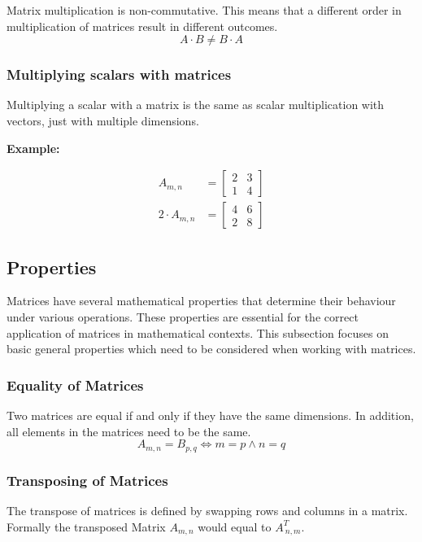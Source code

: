 Matrix multiplication is non-commutative. This means that a different order in multiplication of matrices result in different outcomes.\ \cite{Web:23}
\[
A \cdot B \neq B \cdot A
\]

\subsubsection{Multiplying scalars with matrices}

Multiplying a scalar with a matrix is the same as scalar multiplication with vectors, just with multiple dimensions.

\textbf{Example:}

\[
\begin{aligned}
A_{m,n} &= 
\begin{bmatrix}
2 & 3 \\
1 & 4
\end{bmatrix}\\
2 \cdot A_{m,n} &=
\begin{bmatrix}
4 & 6 \\
2 & 8
\end{bmatrix}
\end{aligned}
\]


\subsection{Properties}
Matrices have several mathematical properties that determine their behaviour under various operations. These properties are essential for the correct application of matrices in mathematical contexts. This subsection focuses on basic general properties which need to be considered when working with matrices.

\subsubsection{Equality of Matrices}
Two matrices are equal if and only if they have the same dimensions. In addition, all elements in the matrices need to be the same.\ \cite{Web:18}
\[
A_{m,n} = B_{p,q} \Longleftrightarrow   m = p \land n = q
\]

\subsubsection{Transposing of Matrices}
The transpose of matrices is defined by swapping rows and columns in a matrix. Formally the transposed Matrix $A_{m,n}$ would equal to $A^T_{\ n,m}$.\ \cite{Web:18}


